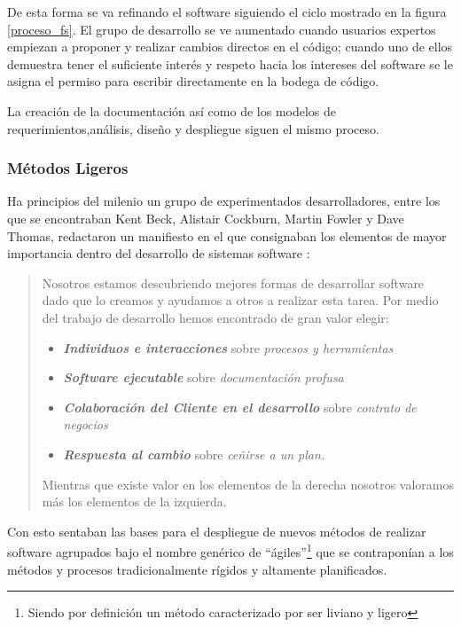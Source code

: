 De esta forma se va refinando el software siguiendo el ciclo mostrado en la figura \ref{proceso_fs}. El grupo de desarrollo se ve aumentado cuando usuarios expertos empiezan a proponer y realizar cambios directos en el código; cuando uno de ellos demuestra tener el suficiente interés y respeto hacia los intereses del software se le asigna el permiso para escribir directamente en la bodega de código.

La creación de la documentación así como de los modelos de requerimientos,análisis, diseño y despliegue siguen el mismo proceso.

\subsubsection{Métodos Ligeros}

Ha principios del milenio un grupo de experimentados desarrolladores, entre los que se encontraban Kent Beck, Alistair Cockburn, Martin Fowler y Dave Thomas, redactaron un manifiesto en el que consignaban los elementos de mayor importancia dentro del desarrollo de sistemas software \cite{beck1999}:
\begin{quote}
Nosotros estamos descubriendo mejores formas de desarrollar software dado que lo creamos y ayudamos a otros a realizar esta tarea. Por medio del trabajo de desarrollo hemos encontrado de gran valor elegir:

\begin{itemize}
\item \textbf{\textit{Individuos e interacciones}} sobre \textit{procesos y herramientas}
\item \textbf{\textit{Software ejecutable}} sobre \textit{documentación profusa}
\item \textbf{\textit{Colaboración del Cliente en el desarrollo}} sobre \textit{contrato de negocios}
\item \textbf{\textit{Respuesta al cambio}} sobre \textit{ceñirse a un plan.}
\end{itemize}

Mientras que existe valor en los elementos de la derecha nosotros valoramos más los elementos de la izquierda.\end{quote}

Con esto sentaban las bases para el despliegue de nuevos métodos de realizar software agrupados bajo el nombre genérico de “ágiles”\footnote{Siendo por definición un método caracterizado por ser liviano y ligero} que se contraponían a los métodos y procesos tradicionalmente rígidos y altamente planificados.

